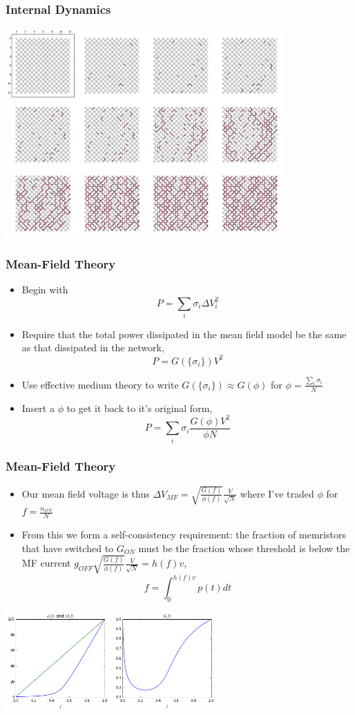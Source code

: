 \documentclass[mathserif]{beamer}
\begin{document}
\begin{frame}
\frametitle{Internal Dynamics}
\begin{center}
\includegraphics[width=0.8\textwidth]{Inside_a_network.png}
\end{center}
\end{frame}

\begin{frame}
\frametitle{Mean-Field Theory}
\begin{itemize}
\item Begin with $$P = \sum_i \sigma_i \Delta V_i^2$$
\item Require that the total power dissipated in the mean field model be the same
as that dissipated in the network,
$$P = G(\{\sigma_i\})V^2$$
\item Use effective medium theory to write $G(\{\sigma_i\})\approx G(\phi)$ for $\phi = \frac{\sum_i \sigma_i}{N}$
\item Insert a $\phi$ to get it back to it's original form,
$$P = \sum_i \sigma_i \frac{G(\phi)V^2}{\phi N}$$
\end{itemize}

\end{frame}

\begin{frame}
\frametitle{Mean-Field Theory}
\begin{itemize}
\item Our mean field voltage is thus
$\Delta V_{MF} = \sqrt{\frac{G(f)}{\phi(f)}}\frac{V}{\sqrt{N}}$
where I've traded $\phi$ for $f = \frac{n_{ON}}{N}$
\item From this we form a self-consistency requirement: the fraction of memristors
that have switched to $G_{ON}$ must be the fraction whose threshold is below the MF
current $g_{OFF} \sqrt{\frac{G(f)}{\phi(f)}}\frac{V}{\sqrt{N}} = h(f)v$,
$$f = \int_0^{h(f)v} p(t) dt$$
\end{itemize}
\begin{center}
\includegraphics[width=0.6\textwidth]{MF_voltage.png}
\end{center}
\end{frame}
\end{document}

